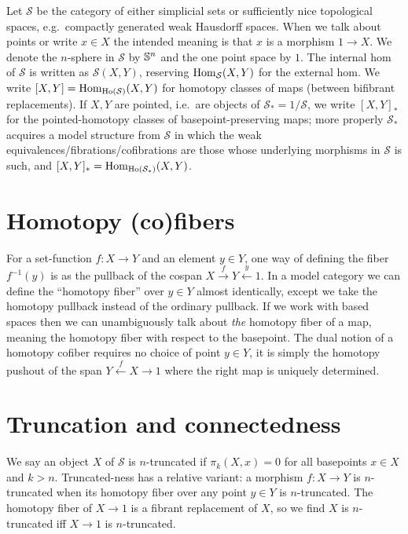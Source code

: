 Let \(\mathcal{S}\) be the category of either simplicial sets or sufficiently nice topological spaces, e.g.~compactly generated weak Hausdorff spaces. When we talk about points or write \(x \in X\) the intended meaning is that \(x\) is a morphism \(1 \to X\). We denote the \(n\)-sphere in \(\mathcal{S}\) by \(\S^n\) and the one point space by \(1\). The internal hom of \(\mathcal{S}\) is written as \(\mathcal{S}(X, Y)\), reserving \(\Hom_{\mathcal{S}}(X, Y)\) for the external hom. We write \([X, Y] = \Hom_{\Ho(\mathcal{S})}(X, Y)\) for homotopy classes of maps (between bifibrant replacements). If \(X, Y\) are pointed, i.e.~are objects of \(\mathcal{S}_* = 1/\mathcal{S}\), we write \([X, Y]_*\) for the pointed-homotopy classes of basepoint-preserving maps; more properly \(\mathcal{S}_*\) acquires a model structure from \(\mathcal{S}\) in which the weak equivalences/fibrations/cofibrations are those whose underlying morphisms in \(\mathcal{S}\) is such, and \([X, Y]_* = \Hom_{\Ho(\mathcal{S}_*)}(X, Y)\).

\section{Homotopy (co)fibers}

For a set-function \(f : X \to Y\) and an element \(y \in Y\), one way of defining the fiber \(f^{-1}(y)\) is as the pullback of the cospan \(X \overset{f}{\to} Y \overset{y}{\leftarrow} 1\). In a model category we can define the ``homotopy fiber'' over \(y \in Y\) almost identically, except we take the homotopy pullback instead of the ordinary pullback. If we work with based spaces then we can unambiguously talk about \emph{the} homotopy fiber of a map, meaning the homotopy fiber with respect to the basepoint. The dual notion of a homotopy cofiber requires no choice of point \(y \in Y\), it is simply the homotopy pushout of the span \(Y \overset{f}{\leftarrow} X \to 1\) where the right map is uniquely determined.

\section{Truncation and connectedness}

We say an object \(X\) of \(\mathcal{S}\) is \(n\)-truncated if \(\pi_k(X, x) = 0\) for all basepoints \(x \in X\) and \(k > n\). Truncated-ness has a relative variant: a morphism \(f : X \to Y\) is \(n\)-truncated when its homotopy fiber over any point \(y \in Y\) is \(n\)-truncated. The homotopy fiber of \(X \to 1\) is a fibrant replacement of \(X\), so we find \(X\) is \(n\)-truncated iff \(X \to 1\) is \(n\)-truncated.

